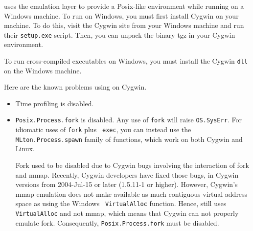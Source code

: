 
{\mlton} uses the 
emulation layer to provide a Posix-like environment while running on a
Windows machine.  To run {\mlton} on Windows, you must first install
Cygwin on your machine.  To do this, visit the Cygwin site from your
Windows machine and run their {\tt setup.exe} script.  Then, you can
unpack the {\mlton} binary tgz in your Cygwin environment.

To run {\mlton} cross-compiled executables on Windows, you must
install the Cygwin {\tt dll} on the Windows machine.

Here are the known problems using {\mlton} on Cygwin.

\begin{itemize}

\item Time profiling is disabled.

\item
{\tt Posix.Process.fork} is disabled.  Any use of {\tt fork} will
raise {\tt OS.SysErr}.  For idiomatic uses of {\tt fork} plus {\tt
exec}, you can instead use the {\tt MLton.Process.spawn} family of
functions, which work on both Cygwin and Linux.

Fork used to be disabled due to Cygwin bugs involving the interaction
of fork and mmap.  Recently, Cygwin developers have fixed those bugs,
in Cygwin versions from 2004-Jul-15 or later (1.5.11-1 or higher).
However, Cygwin's mmap emulation does not make available as much
contiguous virtual address space as using the Windows {\tt
VirtualAlloc} function.  Hence, {\mlton} still uses {\tt VirtualAlloc}
and not mmap, which means that Cygwin can not properly emulate fork.
Consequently, {\tt Posix.Process.fork} must be disabled.

\end{itemize}
